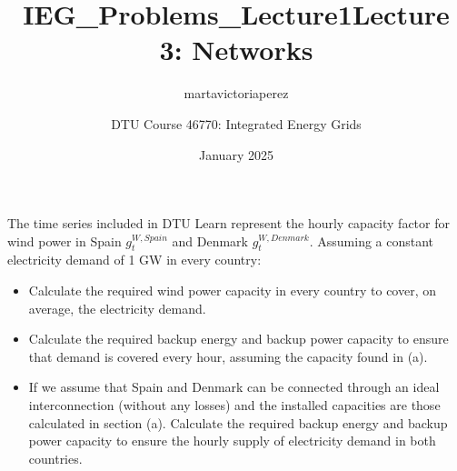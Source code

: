 \documentclass[10pt]{article}
\title{IEG_Problems_Lecture1}
\author{martavictoriaperez }
\date{January 2025}
\newenvironment{problem}[2][Problem]{\begin{trivlist}
\item[\hskip \labelsep {\bfseries #1}\hskip \labelsep {\bfseries #2.}]}{\end{trivlist}}
\begin{document}
 
\title{\textbf{Lecture 3: Networks}}
\author{
DTU Course 46770: Integrated Energy Grids }
\maketitle
\begin{problem}{3.1}

The time series included in DTU Learn represent the hourly capacity factor for wind power in Spain $g_t^{W,Spain}$ and Denmark $g_t^{W,Denmark}$. Assuming a constant electricity demand of 1 GW in every country:

\begin{itemize}
\item[a)] Calculate the required wind power capacity in every country to cover, on average, the electricity demand. 
\item[b)] 	Calculate the required backup energy and backup power capacity to ensure that demand is covered every hour, assuming the capacity found in (a).
\item[c)] If we assume that Spain and Denmark can be connected through an ideal interconnection (without any losses) and the installed capacities are those calculated in section (a). Calculate the required backup energy and backup power capacity to ensure the hourly supply of electricity demand in both countries.
\end{itemize}
\end{problem}

\
\end{document}
